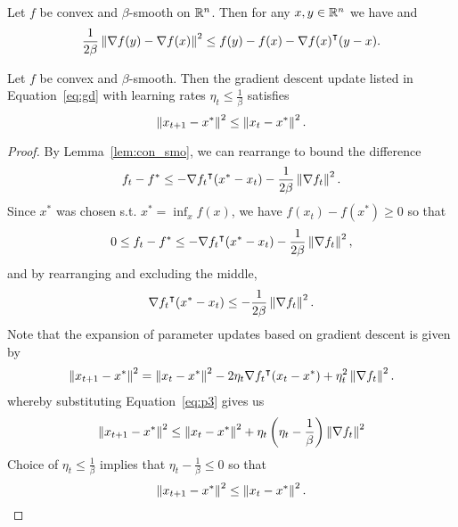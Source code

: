 \begin{lemma}
    \label{lem:con_smo}
    Let $f$ be convex and $\beta$-smooth on $\mathbb R^n$. Then for any $x, y \in \mathbb R^n$ we have
    and
    \begin{equation}
        \label{eq:lem4_2}
\frac{1}{2\beta}
        \left\| \nabla f(y) - \nabla f(x) \right\|^2
        \leq f(y) - f(x) - \nabla {f(x)}^\intercal (y - x) .
    \end{equation}
\end{lemma}

\begin{lemma}
    \label{lem:decreasing_parameter_update}
    Let $f$ be convex and $\beta$-smooth. Then the
    gradient descent update listed in Equation~\ref{eq:gd} with learning rates
    $\eta_t \leq \frac{1}{\beta}$ satisfies
    \begin{equation}
            \left\| x_{t + 1} - x^* \right\|^2 \leq \left\| x_t - x^* \right\|^2.
    \end{equation}
\end{lemma}

\begin{proof}
    By Lemma~\ref{lem:con_smo}, we can rearrange to bound the difference 
    \begin{equation}
        \label{eq:p1}
        f_t - f^* \leq -\nabla {f_t}^\intercal (x^* - x_t) - \frac{1}{2\beta}
        \left\| \nabla f_t \right\|^2.
    \end{equation}
    Since $x^*$ was chosen s.t. $x^* = \inf_x f(x)$, we have $f(x_t) - f(x^*)
    \geq 0$ so that
    \begin{equation}
        \label{eq:p2}
        0 \leq f_t - f^* \leq -\nabla {f_t}^\intercal (x^* - x_t) - \frac{1}{2\beta}
        \left\| \nabla f_t \right\|^2,
    \end{equation}
    and by rearranging and excluding the middle,
    \begin{equation}
        \label{eq:p3}
        \nabla {f_t}^\intercal (x^* - x_t) \leq   - \frac{1}{2\beta}
        \left\| \nabla f_t \right\|^2.
    \end{equation}
    Note that the expansion of parameter updates based on gradient descent is
    given by
    \begin{equation}
        \label{eq:gdupdate}
        \begin{aligned}
            \left\| x_{t + 1} - x^* \right\|^2 &= \left\| x_t - x^* \right\|^2 - 2\eta_t {\nabla
            f_t}^\intercal (x_t - x^*) + \eta_t^2 \left\| \nabla f_t \right\|^2. \\
        \end{aligned}
    \end{equation}
    whereby substituting Equation~\ref{eq:p3} gives us
    \begin{equation}
            \left\| x_{t + 1} - x^* \right\|^2 \leq \left\| x_t - x^* \right\|^2 +
            \eta_t \left(\eta_t - \frac{1}{\beta}  \right) \left\| \nabla f_t \right\|^2
    \end{equation}
    Choice of $\eta_t \leq \frac{1}{\beta}$ implies that $\eta_t -
    \frac{1}{\beta} \leq 0$ so that 
    \begin{equation}
            \left\| x_{t + 1} - x^* \right\|^2 \leq \left\| x_t - x^* \right\|^2.
    \end{equation}
\end{proof}


